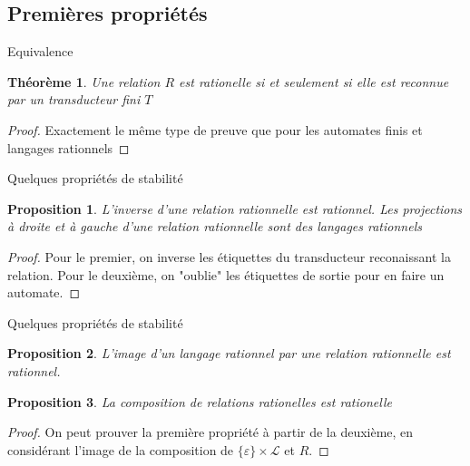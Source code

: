 \documentclass{beamer}
\newtheorem{proposition}{Proposition}
\newtheorem{thm}{Théorème}
\begin{document}
\subsection{Premières propriétés}

\begin{frame}{Equivalence}
    \begin{thm}
        Une relation $R$ est rationelle si et seulement si elle est reconnue par un transducteur fini $T$
    \end{thm}

    \begin{proof}
        Exactement le même type de preuve que pour les automates finis et langages rationnels
    \end{proof}
\end{frame}

\begin{frame}{Quelques propriétés de stabilité}
    \begin{proposition}
        L'inverse d'une relation rationnelle est rationnel. Les projections à droite et à gauche d'une
        relation rationnelle sont des langages rationnels
    \end{proposition}

    \begin{proof}
        Pour le premier, on inverse les étiquettes du transducteur reconaissant la relation. Pour le deuxième, on
        "oublie" les étiquettes de sortie pour en faire un automate.
    \end{proof}

\end{frame}

\begin{frame}{Quelques propriétés de stabilité}
    \begin{proposition}
        L'image d'un langage rationnel par une relation rationnelle est rationnel.
    \end{proposition}
    \begin{proposition}
        La composition de relations rationelles est rationelle
    \end{proposition}

    \begin{proof}
        On peut prouver la première propriété à partir de la deuxième, en considérant l'image de la composition de
        $\{\varepsilon \} \times \mathcal{L}$ et $R$.
    \end{proof}
\end{frame}
\end{document}
